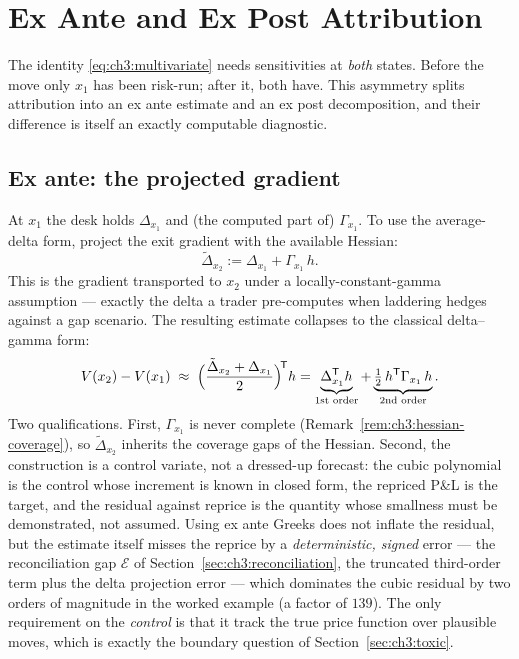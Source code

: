 \documentclass[11pt]{book}
\theoremstyle{plain}
\theoremstyle{definition}
\theoremstyle{remark}
\begin{document}
\section{Ex Ante and Ex Post Attribution}\label{sec:ch3:antepost}

The identity \eqref{eq:ch3:multivariate} needs sensitivities at \emph{both}
states. Before the move only $x_1$ has been risk-run; after it, both have.
This asymmetry splits attribution into an ex ante estimate and an ex post
decomposition, and their difference is itself an exactly computable
diagnostic.

\subsection{Ex ante: the projected gradient}\label{sec:ch3:exante}

At $x_1$ the desk holds $\Delta_{x_1}$ and (the computed part of)
$\Gamma_{x_1}$. To use the average-delta form, project the exit gradient with
the available Hessian:
\begin{equation}\label{eq:ch3:projected-gradient}
  \tilde{\Delta}_{x_2} := \Delta_{x_1} + \Gamma_{x_1}\, h .
\end{equation}
This is the gradient transported to $x_2$ under a locally-constant-gamma
assumption --- exactly the delta a trader pre-computes when laddering hedges
against a gap scenario. The resulting estimate collapses to the classical
delta--gamma form:
\begin{equation}\label{eq:ch3:exante}
  V(x_2) - V(x_1)
  \;\approx\;
  \Bigl(\frac{\tilde{\Delta}_{x_2} + \Delta_{x_1}}{2}\Bigr)^{\!\mathsf T} h
  = \underbrace{\Delta_{x_1}^{\mathsf T} h}_{\text{1st order}}
  + \underbrace{\tfrac{1}{2}\, h^{\mathsf T} \Gamma_{x_1}\,
      h}_{\text{2nd order}} .
\end{equation}
Two qualifications. First,
$\Gamma_{x_1}$ is never complete (Remark~\ref{rem:ch3:hessian-coverage}), so
$\tilde{\Delta}_{x_2}$ inherits the coverage gaps of the Hessian. Second, the
construction is a control variate, not a dressed-up forecast: the cubic
polynomial is the control whose increment is known in closed form, the
repriced P\&L is the target, and the residual against reprice is the quantity
whose smallness must be demonstrated, not assumed. Using ex ante Greeks does
not inflate the residual, but the estimate itself misses the reprice by a
\emph{deterministic, signed} error --- the reconciliation gap $\mathcal{E}$
of Section~\ref{sec:ch3:reconciliation}, the truncated third-order term plus
the delta projection error --- which dominates the cubic residual by
two orders of magnitude in the worked example (a factor of $139$). The only
requirement on the \emph{control} is that it track the true price function
over plausible moves, which is exactly the boundary question of
Section~\ref{sec:ch3:toxic}.
\end{document}
